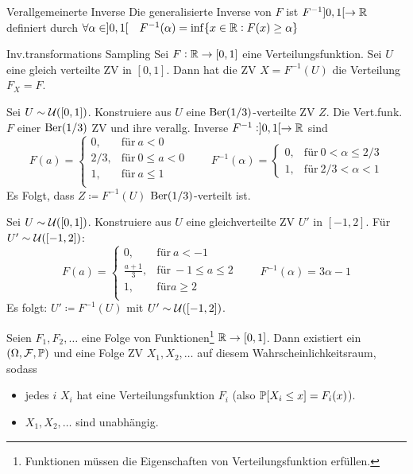 \begin{definition}{Verallgemeinerte Inverse}
	Die generalisierte Inverse von $F$ ist $F^{-1} ]0,1[ \rightarrow \mathbb{R}$ definiert durch
	$ \forall \alpha \in ]0,1[ \quad F^{-1} (\alpha) = \inf \{ x \in \mathbb{R} : F (x) \geq \alpha\} $
\end{definition}
\begin{theorem}{Inv.transformations Sampling}
	Sei $F: \mathbb{R} \rightarrow [0,1]$ eine Verteilungsfunktion. Sei $U$ eine gleich verteilte ZV in $[0,1]$. Dann hat die ZV
	$X = F^{-1} (U)$ die Verteilung $F_X = F$.
\end{theorem}
\begin{example}
	Sei $U \sim \mathcal{U}([0,1])$. Konstruiere aus $U$ eine $\text{Ber}(1/3)$-verteilte ZV $Z$.
	\tcblower
 	Die Vert.funk. $F$ einer $\text{Ber}(1/3)$ ZV und ihre verallg. Inverse $F^{-1} : ]0,1[ \rightarrow \mathbb{R}$ sind
 	\begin{equation*}
 		F(a) = 
 		\begin{cases}
 			0, & \text{für}~a < 0\\
 			2/3, & \text{für}~0 \leq a < 0\\
 			1, & \text{für}~a \leq 1\\
 		\end{cases}
		\qquad
		F^{-1}(\alpha) = 
		\begin{cases}
			0, & \text{für} ~0 < \alpha \leq 2/3\\
			1, & \text{für}~2/3 < \alpha < 1
		\end{cases}
 	\end{equation*}
	Es Folgt, dass $Z \coloneqq F^{-1}(U)$ $\text{Ber}(1/3)$-verteilt ist.
\end{example}
\begin{example}
	Sei $U \sim \mathcal{U}([0,1])$. Konstruiere aus $U$ eine gleichverteilte ZV $U'$ in $[-1,2]$. 
	\tcblower
	Für $U' \sim \mathcal{U}([-1,2])$:
	\begin{equation*}
		F(a) = 
		\begin{cases}
			0, & \text{für}~a < -1\\
			\frac{a + 1}{3}, & \text{für}~ -1 \leq a \leq 2\\
			1, & \text{für} a \geq 2 \\
		\end{cases}
		\qquad
		F^{-1}(\alpha) = 3 \alpha -1
	\end{equation*}
	Es folgt: $U' \coloneqq F^{-1} (U)$ mit $U' \sim \mathcal{U}([-1,2])$.
\end{example}
\begin{theorem}{}
	Seien $F_1, F_2, \ldots$ eine Folge von Funktionen\footnote{Funktionen müssen die Eigenschaften von Verteilungsfunktion
	erfüllen.} $\mathbb{R} \rightarrow [0,1]$. Dann existiert ein $(\Omega, \mathcal{F} , \mathbb{P})$ und eine Folge \iid ZV $X_1 , X_2 , \ldots$
	auf diesem Wahrscheinlichkeitsraum, sodass 
	\begin{itemize}
		\item jedes $i$ $X_i$ hat eine Verteilungsfunktion $F_i$ (also $\mathbb{P} [X_i \leq x] = F_i (x)$).
		\item $X_1 , X_2 , \ldots$ sind unabhängig.
	\end{itemize}
\end{theorem}
